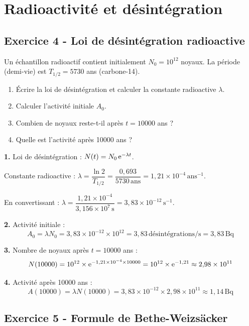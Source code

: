 \documentclass[12pt,a4paper]{article}
\begin{document}
\newpage
\section{Radioactivité et désintégration}

\subsection*{Exercice 4 - Loi de désintégration radioactive \niveau{\moyen}}

\begin{boiteexercice}
Un échantillon radioactif contient initialement $N_0 = 10^{12}$ noyaux. La période (demi-vie) est $T_{1/2} = 5730$ ans (carbone-14).
\begin{enumerate}
  \item Écrire la loi de désintégration et calculer la constante radioactive $\lambda$.
  \item Calculer l'activité initiale $A_0$.
  \item Combien de noyaux reste-t-il après $t = 10000$ ans ?
  \item Quelle est l'activité après 10000 ans ?
\end{enumerate}
\end{boiteexercice}

\begin{boitecorrige}
\textbf{1.} Loi de désintégration : $N(t) = N_0\,\mathrm{e}^{-\lambda t}$.

Constante radioactive : $\lambda = \dfrac{\ln 2}{T_{1/2}} = \dfrac{0{,}693}{5730\,\text{ans}} = 1{,}21\times10^{-4}\,\text{ans}^{-1}$.

En convertissant : $\lambda = \dfrac{1{,}21\times10^{-4}}{3{,}156\times10^7\,\text{s}} = 3{,}83\times10^{-12}\,\text{s}^{-1}$.

\textbf{2.} Activité initiale :
\[
A_0 = \lambda N_0 = 3{,}83\times10^{-12} \times 10^{12} = 3{,}83\,\text{désintégrations/s} = 3{,}83\,\text{Bq}
\]

\textbf{3.} Nombre de noyaux après $t = 10000$ ans :
\[
N(10000) = 10^{12}\times\mathrm{e}^{-1{,}21\times10^{-4}\times10000} = 10^{12}\times\mathrm{e}^{-1{,}21} \approx 2{,}98\times10^{11}
\]

\textbf{4.} Activité après 10000 ans :
\[
A(10000) = \lambda N(10000) = 3{,}83\times10^{-12}\times2{,}98\times10^{11} \approx 1{,}14\,\text{Bq}
\]
\end{boitecorrige}

\subsection*{Exercice 5 - Formule de Bethe-Weizsäcker \niveau{\difficile}}
\end{document}
